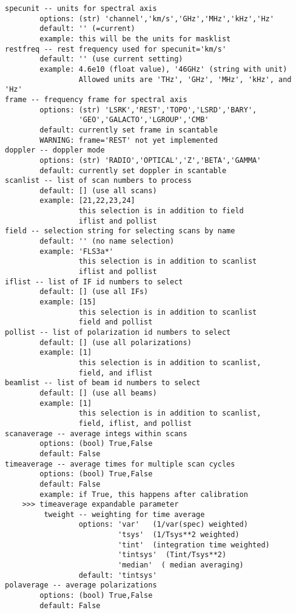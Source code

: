 \begin{verbatim}
specunit -- units for spectral axis
        options: (str) 'channel','km/s','GHz','MHz','kHz','Hz'
        default: '' (=current)
        example: this will be the units for masklist
restfreq -- rest frequency used for specunit='km/s'
        default: '' (use current setting)
        example: 4.6e10 (float value), '46GHz' (string with unit)
                 Allowed units are 'THz', 'GHz', 'MHz', 'kHz', and 'Hz'
frame -- frequency frame for spectral axis
        options: (str) 'LSRK','REST','TOPO','LSRD','BARY',
                 'GEO','GALACTO','LGROUP','CMB'
        default: currently set frame in scantable
        WARNING: frame='REST' not yet implemented
doppler -- doppler mode
        options: (str) 'RADIO','OPTICAL','Z','BETA','GAMMA'
        default: currently set doppler in scantable
scanlist -- list of scan numbers to process
        default: [] (use all scans)
        example: [21,22,23,24]
                 this selection is in addition to field
                 iflist and pollist
field -- selection string for selecting scans by name
        default: '' (no name selection)
        example: 'FLS3a*'
                 this selection is in addition to scanlist
                 iflist and pollist
iflist -- list of IF id numbers to select
        default: [] (use all IFs)
        example: [15]
                 this selection is in addition to scanlist
                 field and pollist
pollist -- list of polarization id numbers to select
        default: [] (use all polarizations)
        example: [1]
                 this selection is in addition to scanlist,
                 field, and iflist
beamlist -- list of beam id numbers to select
        default: [] (use all beams)
        example: [1]
                 this selection is in addition to scanlist,
                 field, iflist, and pollist
scanaverage -- average integs within scans
        options: (bool) True,False
        default: False
timeaverage -- average times for multiple scan cycles
        options: (bool) True,False
        default: False
        example: if True, this happens after calibration
    >>> timeaverage expandable parameter
         tweight -- weighting for time average
                 options: 'var'   (1/var(spec) weighted)
                          'tsys'  (1/Tsys**2 weighted)
                          'tint'  (integration time weighted)
                          'tintsys'  (Tint/Tsys**2)
                          'median'  ( median averaging)
                 default: 'tintsys'
polaverage -- average polarizations
        options: (bool) True,False
        default: False

\end{verbatim}
